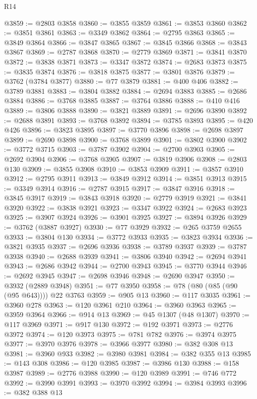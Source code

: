 \begin{lexlean}{R14}
\begin{coremodule}
{{{{{{{{{{{{{{{{{{{{{{{{{{{{{{{{{{{{{{{{{{{{{{{{{{{{{{{{{{{{{{{{{{{{{{{{{{{{{{{{{{{{{{{{{{{{{{{{{{{{{{{{{{@3859 := @2803 @3858
@3860 := @3855 @3859
@3861 := @3853 @3860
@3862 := @3851 @3861
@3863 := @3349 @3862
@3864 := @2795 @3863
@3865 := @3849 @3864
@3866 := @3847 @3865
@3867 := @3845 @3866
@3868 := @3843 @3867
@3869 := @2787 @3868
@3870 := @2779 @3869
@3871 := @3841 @3870
@3872 := @3838 @3871
@3873 := @3347 @3872
@3874 := @2683 @3873
@3875 := @3835 @3874
@3876 := @3818 @3875
@3877 := @3801 @3876
@3879 := @3762 (@3784 @3877)
@3880 := @77 @3879
@3881 := @400 @406
@3882 := @3789 @3881
@3883 := @3804 @3882
@3884 := @2694 @3883
@3885 := @2686 @3884
@3886 := @3768 @3885
@3887 := @3764 @3886
@3888 := @410 @416
@3889 := @3806 @3888
@3890 := @3821 @3889
@3891 := @2696 @3890
@3892 := @2688 @3891
@3893 := @3768 @3892
@3894 := @3785 @3893
@3895 := @420 @426
@3896 := @3823 @3895
@3897 := @3770 @3896
@3898 := @2698 @3897
@3899 := @2690 @3898
@3900 := @3768 @3899
@3901 := @3802 @3900
@3902 := @3772 @3715
@3903 := @3787 @3902
@3904 := @2700 @3903
@3905 := @2692 @3904
@3906 := @3768 @3905
@3907 := @3819 @3906
@3908 := @2803 @130
@3909 := @3855 @3908
@3910 := @3853 @3909
@3911 := @3857 @3910
@3912 := @2795 @3911
@3913 := @3849 @3912
@3914 := @3851 @3913
@3915 := @3349 @3914
@3916 := @2787 @3915
@3917 := @3847 @3916
@3918 := @3845 @3917
@3919 := @3843 @3918
@3920 := @2779 @3919
@3921 := @3841 @3920
@3922 := @3838 @3921
@3923 := @3347 @3922
@3924 := @2683 @3923
@3925 := @3907 @3924
@3926 := @3901 @3925
@3927 := @3894 @3926
@3929 := @3762 (@3887 @3927)
@3930 := @77 @3929
@3932 := @265 @3759 @2655
@3933 := @3804 @130
@3934 := @3772 @3933
@3935 := @3823 @3934
@3936 := @3821 @3935
@3937 := @2696 @3936
@3938 := @3789 @3937
@3939 := @3787 @3938
@3940 := @2688 @3939
@3941 := @3806 @3940
@3942 := @2694 @3941
@3943 := @2686 @3942
@3944 := @2700 @3943
@3945 := @3770 @3944
@3946 := @2692 @3945
@3947 := @2698 @3946
@3948 := @2690 @3947
@3950 := @3932 (@2889 @3948)
@3951 := @77 @3950
@3958 := @78 (@80 (@85 (@90 (@95 @643)))) @22 @3763
@3959 := @905 @13
@3960 := @117 @3035
@3961 := @3960 @278
@3963 := @120 @3961 @210
@3964 := @3960 @3963
@3965 := @3959 @3964
@3966 := @914 @13
@3969 := @45 @1307 (@48 @1307)
@3970 := @117 @3969
@3971 := @917 @130
@3972 := @192 @3971
@3973 := @2776 @3972
@3974 := @120 @3973
@3975 := @781 @782
@3976 := @3974 @3975
@3977 := @3970 @3976
@3978 := @3966 @3977
@3980 := @382 @308 @13
@3981 := @3960 @933
@3982 := @3980 @3981
@3984 := @382 @355 @13
@3985 := @143 @308
@3986 := @120 @3985
@3987 := @3986 @130
@3988 := @158 @3987
@3989 := @2776 @3988
@3990 := @120 @3989
@3991 := @746 @772
@3992 := @3990 @3991
@3993 := @3970 @3992
@3994 := @3984 @3993
@3996 := @382 @388 @13
}}}}}}}}}}}}}}}}}}}}}}}}}}}}}}}}}}}}}}}}}}}}}}}}}}}}}}}}}}}}}}}}}}}}}}}}}}}}}}}}}}}}}}}}}}}}}}}}}}}}}}}}}}
\end{coremodule}
\end{lexlean}
